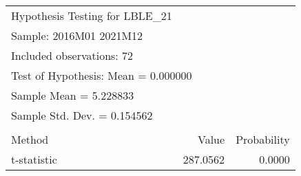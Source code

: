 \begin{tabular}{lrrr}
\toprule
\multicolumn{2}{l}{Hypothesis Testing for LBLE\_21}&\multicolumn{1}{c}{}&\multicolumn{1}{c}{}\\
\multicolumn{2}{l}{Sample: 2016M01 2021M12}&\multicolumn{1}{c}{}&\multicolumn{1}{c}{}\\
\multicolumn{2}{l}{Included observations: 72}&\multicolumn{1}{c}{}&\multicolumn{1}{c}{}\\
\multicolumn{3}{l}{Test of Hypothesis: Mean =  0.000000}&\multicolumn{1}{c}{}\\
\midrule
\multicolumn{2}{l}{Sample Mean =  5.228833}&\multicolumn{1}{c}{}&\multicolumn{1}{c}{}\\
\multicolumn{2}{l}{Sample Std. Dev. =  0.154562}&\multicolumn{1}{c}{}&\multicolumn{1}{c}{}\\
\multicolumn{1}{c}{}&\multicolumn{1}{c}{}&\multicolumn{1}{c}{}&\multicolumn{1}{c}{}\\
\multicolumn{1}{l}{Method}&\multicolumn{1}{c}{}&\multicolumn{1}{r}{Value}&\multicolumn{1}{r}{Probability}\\
\multicolumn{1}{l}{t-statistic}&\multicolumn{1}{c}{}&\multicolumn{1}{r}{287.0562}&\multicolumn{1}{r}{0.0000}\\
\bottomrule
\end{tabular}
